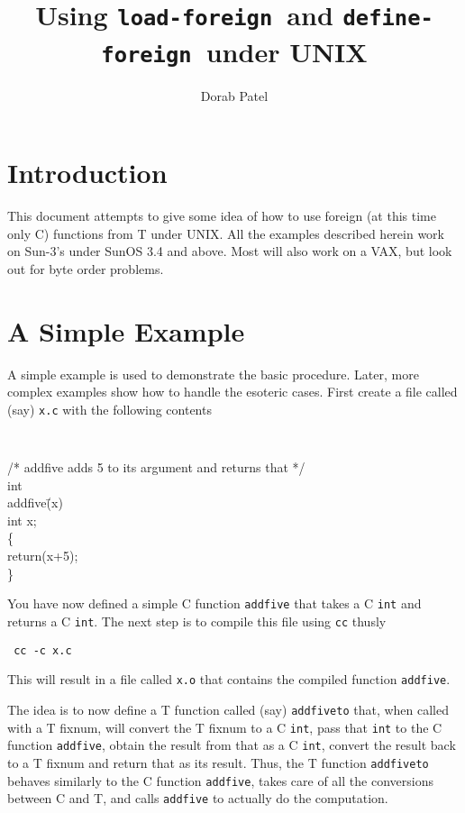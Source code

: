 \newcommand{\lf}{{\tt load-foreign}}
\newcommand{\df}{{\tt define-foreign}}
\newcommand{\unix}{{\sc UNIX}}
\newcommand{\horizline}{\makebox[0.5\textwidth]{\hrulefill}}
\title{Using \lf\ and \df\ under \unix}
\author{Dorab Patel}


\maketitle

\section{Introduction}
\label{sec-intro}

This document attempts to give some idea of how to use foreign (at
this time only C) functions from T under \unix.
All the examples described herein work on Sun-3's under SunOS 3.4 and
above.
Most will also work on a VAX, but look out for byte order problems.

\section{A Simple Example}
\label{sec-example}

A simple example is used to demonstrate the basic procedure.
Later, more complex examples show how to handle the esoteric cases.
First create a file called (say) {\tt x.c} with the following contents

\horizline
{\tt
\begin{tabbing}
/* addfive adds 5 to its argument and returns that */\\
int\\
addfive\= (x)\\
	\> int x;\\
\{\\
	\> return(x+5);\\
\}
\end{tabbing}
}
\horizline

You have now defined a simple C function {\tt addfive} that takes a C
{\tt int} and returns a C {\tt int}.
The next step is to compile this file using {\tt cc} thusly
\begin{center}
\tt
cc -c x.c
\end{center}
This will result in a file called {\tt x.o} that contains the
compiled function {\tt addfive}.

The idea is to now define a T function called (say) {\tt addfiveto}
that, when called with a T fixnum, will convert the T fixnum to a C
{\tt int}, pass that {\tt int} to the C function {\tt addfive},
obtain the result from that as a C {\tt int}, convert the result back
to a T fixnum and return that as its result.
Thus, the T function {\tt addfiveto} behaves similarly to the C
function {\tt addfive}, takes care of all the conversions between C
and T, and calls {\tt addfive} to actually do the computation.

